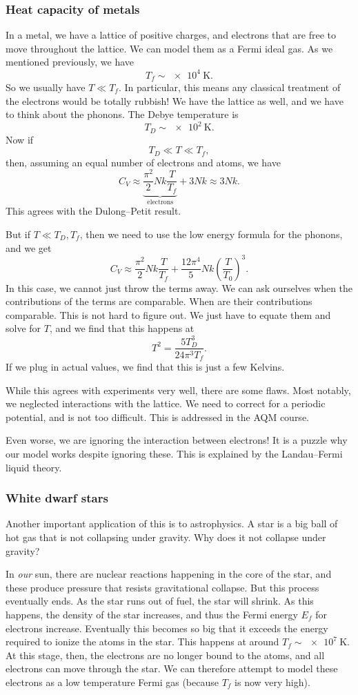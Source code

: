 \documentclass[a4paper]{article}
\begin{document}
\subsubsection*{Heat capacity of metals}
In a metal, we have a lattice of positive charges, and electrons that are free to move throughout the lattice. We can model them as a Fermi ideal gas. As we mentioned previously, we have
\[
  T_f \sim \SI{e4}{\kelvin}.
\]
So we usually have $T \ll T_f$. In particular, this means any classical treatment of the electrons would be totally rubbish! We have the lattice as well, and we have to think about the phonons. The Debye temperature is
\[
  T_D \sim \SI{e2}{\kelvin}.
\]
Now if
\[
  T_D \ll T \ll T_f,
\]
then, assuming an equal number of electrons and atoms, we have
\[
  C_V \approx \underbrace{\frac{\pi^2}{2} Nk \frac{T}{T_f}}_{\mathrm{electrons}} + 3Nk \approx 3Nk.
\]
This agrees with the Dulong--Petit result.

But if $T \ll T_D, T_f$, then we need to use the low energy formula for the phonons, and we get
\[
  C_V \approx \frac{\pi^2}{2} Nk \frac{T}{T_f} + \frac{12 \pi^4}{5} Nk \left(\frac{T}{T_0}\right)^3.
\]
In this case, we cannot just throw the terms away. We can ask ourselves when the contributions of the terms are comparable. When are their contributions comparable. This is not hard to figure out. We just have to equate them and solve for $T$, and we find that this happens at
\[
  T^2 = \frac{5 T_D^3}{24 \pi^3 T_f}.
\]
If we plug in actual values, we find that this is just a few Kelvins.

While this agrees with experiments very well, there are some flaws. Most notably, we neglected interactions with the lattice. We need to correct for a periodic potential, and is not too difficult. This is addressed in the AQM course.

Even worse, we are ignoring the interaction between electrons! It is a puzzle why our model works despite ignoring these. This is explained by the Landau--Fermi liquid theory.

\subsubsection*{White dwarf stars}
Another important application of this is to astrophysics. A star is a big ball of hot gas that is not collapsing under gravity. Why does it not collapse under gravity?

In \emph{our} sun, there are nuclear reactions happening in the core of the star, and these produce pressure that resists gravitational collapse. But this process eventually ends. As the star runs out of fuel, the star will shrink. As this happens, the density of the star increases, and thus the Fermi energy $E_f$ for electrons increase. Eventually this becomes so big that it exceeds the energy required to ionize the atoms in the star. This happens at around $T_f \sim \SI{e7}{\kelvin}$. At this stage, then, the electrons are no longer bound to the atoms, and all electrons can move through the star. We can therefore attempt to model these electrons as a low temperature Fermi gas (because $T_f$ is now very high).
\end{document}
